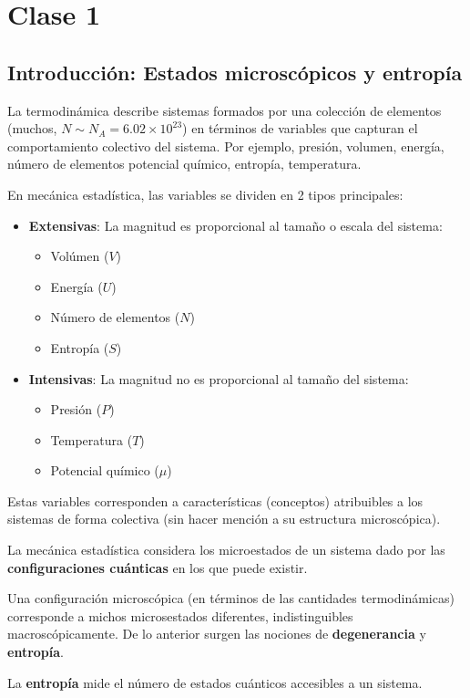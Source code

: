 \section{Clase 1}
\subsection{Introducción: Estados microscópicos y entropía}
La termodinámica describe sistemas formados por una colección de elementos (muchos, $N\sim N_A=6.02\times 10^{23}$) en términos de variables que capturan el comportamiento colectivo del sistema. Por ejemplo, presión, volumen, energía, número de elementos potencial químico, entropía, temperatura.

En mecánica estadística, las variables se dividen en 2 tipos principales:
\begin{itemize}
	\item \textbf{Extensivas}: La magnitud es proporcional al tamaño o escala del sistema:
	\begin{itemize}
	\item Volúmen ($V$)
	\item Energía ($U$)
	\item Número de elementos ($N$)
	\item Entropía ($S$)
	\end{itemize}
	\item \textbf{Intensivas}: La magnitud no es proporcional al tamaño del sistema:
	\begin{itemize}
	\item Presión ($P$)
	\item Temperatura ($T$)
	\item Potencial químico ($\mu$)
	\end{itemize}
\end{itemize}

Estas variables corresponden a características (conceptos) atribuibles a los sistemas de forma colectiva (sin hacer mención a su estructura microscópica).

La mecánica estadística considera los microestados de un sistema dado por las \textbf{configuraciones cuánticas} en los que puede existir.

Una configuración microscópica (en términos de las cantidades termodinámicas) corresponde a michos microsestados diferentes, indistinguibles macroscópicamente. De lo anterior surgen las nociones de \textbf{degenerancia} y \textbf{entropía}.

La \textbf{entropía} mide el número de estados cuánticos accesibles a un sistema.

